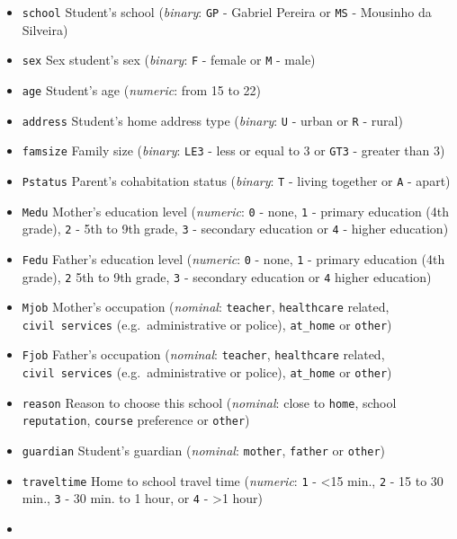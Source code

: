 \documentclass[
]{book}
\providecommand{\tightlist}{%
  \setlength{\itemsep}{0pt}\setlength{\parskip}{0pt}}
\begin{document}
\begin{itemize}
\tightlist
\item
  \texttt{school} Student's school (\emph{binary}: \texttt{GP} - Gabriel Pereira or \texttt{MS} - Mousinho da Silveira)
\item
  \texttt{sex} Sex student's sex (\emph{binary}: \texttt{F} - female or \texttt{M} - male)
\item
  \texttt{age} Student's age (\emph{numeric}: from 15 to 22)
\item
  \texttt{address} Student's home address type (\emph{binary}: \texttt{U} - urban or \texttt{R} - rural)
\item
  \texttt{famsize} Family size (\emph{binary}: \texttt{LE3} - less or equal to 3 or \texttt{GT3} - greater than 3)
\item
  \texttt{Pstatus} Parent's cohabitation status (\emph{binary}: \texttt{T} - living together or \texttt{A} - apart)
\item
  \texttt{Medu} Μother's education level (\emph{numeric}: \texttt{0} - none, \texttt{1} - primary education (4th grade), \texttt{2} - 5th to 9th grade, \texttt{3} - secondary education or \texttt{4} - higher education)
\item
  \texttt{Fedu} Father's education level (\emph{numeric}: \texttt{0} - none, \texttt{1} - primary education (4th grade), \texttt{2} 5th to 9th grade, \texttt{3} - secondary education or \texttt{4} higher education)
\item
  \texttt{Mjob} Mother's occupation (\emph{nominal}: \texttt{teacher}, \texttt{healthcare} related, \texttt{civil\ services} (e.g.~administrative or police), \texttt{at\_home} or \texttt{other})
\item
  \texttt{Fjob} Father's occupation (\emph{nominal}: \texttt{teacher}, \texttt{healthcare} related, \texttt{civil\ services} (e.g.~administrative or police), \texttt{at\_home} or \texttt{other})
\item
  \texttt{reason} Reason to choose this school (\emph{nominal}: close to \texttt{home}, school \texttt{reputation}, \texttt{course} preference or \texttt{other})
\item
  \texttt{guardian} Student's guardian (\emph{nominal}: \texttt{mother}, \texttt{father} or \texttt{other})
\item
  \texttt{traveltime} Home to school travel time (\emph{numeric}: \texttt{1} - \textless15 min., \texttt{2} - 15 to 30 min., \texttt{3} - 30 min. to 1 hour, or \texttt{4} - \textgreater1 hour)
\item

\end{itemize}
\end{document}
